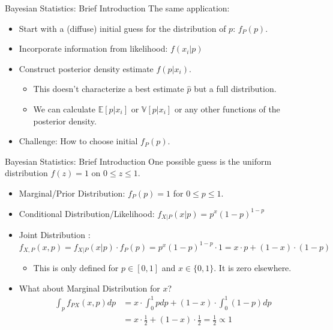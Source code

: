 \documentclass[aspectratio=169]{beamer}
\begin{document}
\begin{frame}{Bayesian Statistics: Brief Introduction}
The same application:
\begin{itemize}
\item Start with a (diffuse) initial guess for the distribution of $p$: $f_P(p)$.
\item Incorporate information from likelihood: $f(x_i | p)$
\item Construct \alert{posterior density} estimate $f(p | x_i)$.
\begin{itemize}
\item This doesn't characterize a best estimate $\hat{p}$ but a full distribution.
\item We can calculate $\mathbb{E}[p | x_i]$ or $\mathbb{V}[p |x_i]$ or any other functions of the posterior density.
\end{itemize}
\item Challenge: How to choose initial $f_P(p)$.
\end{itemize}
\end{frame}



\begin{frame}{Bayesian Statistics: Brief Introduction}
One possible guess is the uniform distribution $f(z) = 1$ on $0 \leq z \leq 1$.
\begin{itemize}
\item \alert{Marginal/Prior Distribution}: $f_P(p) = 1$ for $0 \leq p \leq 1$.
\item \alert{Conditional Distribution}/Likelihood: $f_{X|P} (x | p) = p^x (1-p)^{1-p}$
\item \alert{Joint Distribution} : $f_{X,P}(x, p)=f_{X|P}(x | p)\cdot f_P(p)  = p^x (1-p)^{1-p}\cdot 1 = x \cdot p + (1-x) \cdot (1-p)$
\begin{itemize}
\item This is only defined for $p \in[0,1]$ and $x \in \{0,1\}$. It is zero elsewhere.
\end{itemize}
\item What about \alert{Marginal Distribution} for $x$?
\begin{align*}
\int _ { p } f _ { P X } ( x , p ) d p &= x \cdot \int _ { 0 } ^ { 1 } p d p + ( 1 - x ) \cdot \int _ { 0 } ^ { 1 } ( 1 - p ) d p \\
&= x \cdot \frac { 1 } { 2 } + ( 1 - x ) \cdot \frac { 1 } { 2 } = \frac { 1 } { 2 } \propto 1
\end{align*}
\end{itemize}
\end{frame}
\end{document}
